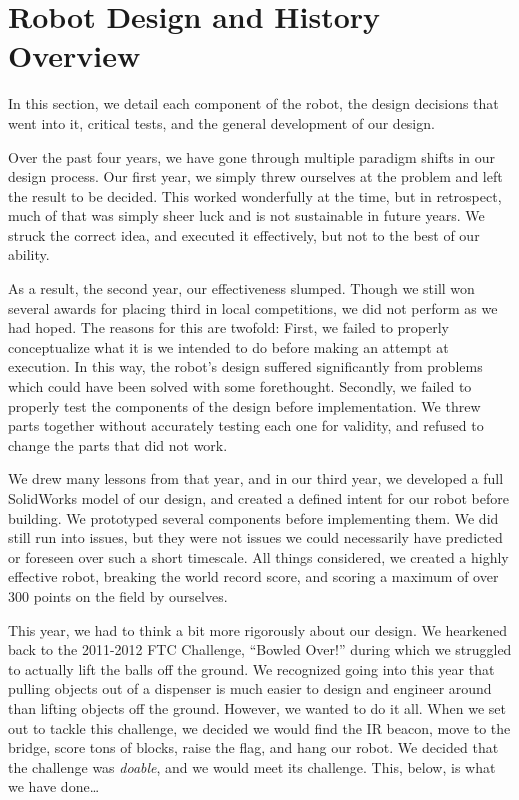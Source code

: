 \section{Robot Design and History Overview}
In this section, we detail each component of the robot, the design decisions that went into it, critical tests, and the general development of our design.

Over the past four years, we have gone through multiple paradigm shifts in our design process. Our first year, we simply threw ourselves at the problem and left the result to be decided. This worked wonderfully at the time, but in retrospect, much of that was simply sheer luck and is not sustainable in future years. We struck the correct idea, and executed it effectively, but not to the best of our ability. 
	
As a result, the second year, our effectiveness slumped. Though we still won several awards for placing third in local competitions, we did not perform as we had hoped. The reasons for this are twofold: First, we failed to properly conceptualize what it is we intended to do before making an attempt at execution. In this way, the robot's design suffered significantly from problems which could have been solved with some forethought. Secondly, we failed to properly test the components of the design before implementation. We threw parts together without accurately testing each one for validity, and refused to change the parts that did not work.

We drew many lessons from that year, and in our third year, we developed a full SolidWorks model of our design, and created a defined intent for our robot before building. We prototyped several components before implementing them. We did still run into issues, but they were not issues we could necessarily have predicted or foreseen over such a short timescale. All things considered, we created a highly effective robot, breaking the world record score, and scoring a maximum of over 300 points on the field by ourselves.

This year, we had to think a bit more rigorously about our design. We hearkened back to the 2011-2012 FTC Challenge, ``Bowled Over!'' during which we struggled to actually lift the balls off the ground. We recognized going into this year that pulling objects out of a dispenser is much easier to design and engineer around than lifting objects off the ground. However, we wanted to do it all. When we set out to tackle this challenge, we decided we would find the IR beacon, move to the bridge, score tons of blocks, raise the flag, and hang our robot. We decided that the challenge was \textit{doable}, and we would meet its challenge. This, below, is what we have done\ldots

